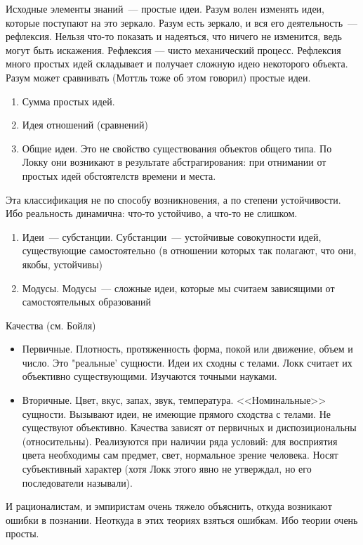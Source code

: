 Исходные элементы знаний~--- простые идеи. Разум волен изменять идеи, которые поступают
на это зеркало. Разум есть зеркало, и вся его деятельность~--- рефлексия. Нельзя что-то показать и надеяться, что ничего не изменится, ведь могут быть искажения. Рефлексия --- чисто механический процесс. Рефлексия много простых идей складывает и получает сложную идею некоторого объекта. Разум может сравнивать (Моттль тоже об этом говорил) простые идеи.
\begin{enumerate}
	\item Сумма простых идей.
	\item Идея отношений (сравнений)
	\item Общие идеи. Это не свойство существования объектов общего типа. По Локку они возникают в результате абстрагирования: при отнимании от простых идей обстоятелств времени и места.
\end{enumerate}
	
Эта классификация не по способу возникновения, а по степени устойчивости. Ибо реальность динамична: что-то устойчиво, а что-то не слишком.
\begin{enumerate}
	\item Идеи~--- субстанции. Субстанции~--- устойчивые совокупности идей, существующие самостоятельно (в отношении которых так полагают, что они, якобы, устойчивы)
	\item Модусы. Модусы~--- сложные идеи, которые мы считаем зависящими от самостоятельных образований
\end{enumerate}
	
Качества (см. Бойля)
\begin{itemize}
 	\item Первичные. Плотность, протяженность форма, покой или движение, объем и число. Это "реальные' сущности. Идеи их сходны с телами. Локк считает их объективно существующими. Изучаются точными науками.
	\item Вторичные. Цвет, вкус, запах, звук, температура. <<Номинальные>> сущности. Вызывают идеи, не имеющие прямого сходства с телами. Не существуют объективно. Качества зависят от первичных и диспозициональны (относительны). Реализуются при наличии ряда условий: для восприятия цвета необходимы сам предмет, свет, нормальное зрение человека. Носят субъективный характер (хотя Локк этого явно не утверждал, но его последователи называли).
\end{itemize} 

И рационалистам, и эмпиристам очень тяжело объяснить, откуда возникают ошибки в познании. Неоткуда в этих теориях взяться ошибкам. Ибо теории очень просты.

